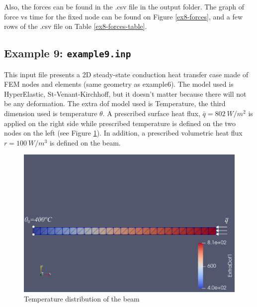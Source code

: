 \documentclass[oneside,11pt,times]{book}
\begin{document}
Also, the forces can be found in the .csv file in the output folder. The graph of force vs time for the fixed node can be found on Figure \ref{ex8-forces}, and a few rows of the .csv file on Table \ref{ex8-forces-table}.
\newpage
\subsection{Example 9: \texttt{example9.inp}}
This input file presents a 2D steady-state conduction heat transfer case made of FEM nodes and elements (same geometry as example6). The model used is HyperElastic, St-Venant-Kirchhoff, but it doesn't matter because there will not be any deformation. The extra dof model used is Temperature, the third dimension used is temperature $\theta$. A prescribed surface heat flux, $\bar{q}=802\ W/m^2$ is applied on the right side while prescribed temperature is defined on the two nodes on the left (see Figure \ref{fig:ex9}). In addition, a prescribed volumetric heat flux $r=100\ W/m^3$ is defined on the beam.
\begin{figure}[h!]
    \centering
    \includegraphics[width=0.8\linewidth]{imgs/Examples/ex9.pdf}
    \caption{Temperature distribution of the beam}
    \label{fig:ex9}
\end{figure}
\newpage
\end{document}
